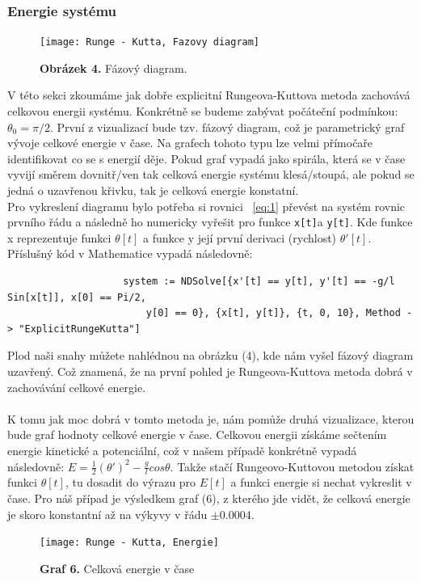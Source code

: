 \documentclass[reqno, a4paper]{amsart}
\begin{document}
				\subsubsection{Energie systému}
				\label{sec:sys-energy}
				\begin{figure}
					\texttt{[image: Runge - Kutta, Fazovy diagram]}
					\caption*{\textbf{Obrázek 4.} Fázový diagram.}
				\end{figure}
				V této sekci zkoumáme jak dobře explicitní Rungeova-Kuttova metoda zachovává celkovou energii systému. Konkrétně se budeme zabývat počáteční podmínkou: $\theta_{0} = \pi /2$. První z vizualizací bude tzv. fázový diagram, což je parametrický graf vývoje celkové energie v čase. Na grafech tohoto typu lze velmi přímočaře identifikovat co se s energií děje. Pokud graf vypadá jako spirála, která se v čase vyvijí směrem dovnitř/ven tak celková energie systému klesá/stoupá, ale pokud se jedná o uzavřenou křivku, tak je celková energie konstatní.\\
				Pro vykreslení diagramu bylo potřeba si rovnici ~\eqref{eq:1} převést na systém rovnic prvního řádu a následně ho numericky vyřešit pro funkce \verb|x[t]|a \verb|y[t]|. Kde funkce x reprezentuje funkci $\theta [t]$ a funkce y její první derivaci (rychlost) $\theta' [t]$. Příslušný kód v Mathematice vypadá následovně:
				\begin{verbatim}
					system := NDSolve[{x'[t] == y[t], y'[t] == -g/l Sin[x[t]], x[0] == Pi/2,
						y[0] == 0}, {x[t], y[t]}, {t, 0, 10}, Method -> "ExplicitRungeKutta"]
				\end{verbatim}
				Plod naši snahy můžete nahlédnou na obrázku (4), kde nám vyšel fázový diagram uzavřený. Což znamená, že na první pohled je Rungeova-Kuttova metoda dobrá v zachovávání celkové energie.\\ \\
				K tomu jak moc dobrá v tomto metoda je, nám pomůže druhá vizualizace, kterou bude graf hodnoty celkové energie v čase. Celkovou energii získáme sečtením energie kinetické a potenciální, což v našem případě konkrétně vypadá následovně: $E = \frac{1}{2} (\theta')^2 - \frac{g}{l} cos \theta$. Takže stačí Rungeovo-Kuttovou metodou získat funkci $\theta[t]$, tu dosadit do výrazu pro $E[t]$ a funkci energie si nechat vykreslit v čase. Pro náš případ je výsledkem graf (6), z kterého jde vidět, že celková energie je skoro konstantní až na výkyvy v řádu $\pm 0.0004$.
				\begin{figure}[h]
					\begin{flushleft}
						\texttt{[image: Runge - Kutta, Energie]}
						\caption*{\textbf{Graf 6.} Celková energie v čase}
					\end{flushleft}
				\end{figure}
\end{document}
